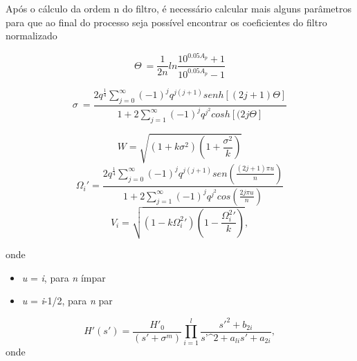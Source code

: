 \documentclass[a4paper,10pt]{article}
\begin{document}
	Após o cálculo da ordem n do filtro, é necessário calcular mais alguns parâmetros para que ao final do processo seja possível encontrar os coeficientes do filtro normalizado

	\begin{equation}
		\Theta\ = \frac{1}{2n}ln\frac{10^{0.05A_{p}} + 1}{10^{0.05A_{p}} - 1}
	\end{equation}
	
	\begin{equation}
		\sigma\ =  \frac{2q^{\frac{1}{4}}\sum_{j=0}^{\infty} (-1)^{j} q^{j(j+1)} senh[(2j+1)\Theta]}								{1+2\sum_{j=1}^{\infty}  (-1)^{j} q^{j^{2}} cosh[(2j\Theta]}
	\end{equation}
	
	\begin{equation}
		W = \sqrt{(1+k\sigma^{2})(1+\frac{\sigma^{2}}{k})}
	\end{equation}
	\begin{equation}
		\Omega_{i}' =	\frac{2q^{\frac{1}{4}}\sum_{j=0}^{\infty} (-1)^{j} q^{j(j+1)} sen(\frac{(2j+1)\pi 		u}		{n})}								{1+2\sum_{j=1}^{\infty}  (-1)^{j} q^{j^{2}} 					cos(\frac{2j\pi u}			{n})}
	\end{equation}
	\begin{equation}
		V_{i} = \sqrt{(1-k\Omega_{i}^{2}')(1-\frac{\Omega_{i}^{2}'}{k})} ,
	\end{equation}
	
	onde
	
	\begin{itemize}
		\item \textit{u} = \textit{i},  para \textit{n} ímpar
		\item \textit{u} = \textit{i}-1/2,  para \textit{n} par	
	\end{itemize}
	
	\begin{equation}
		H'(\textit{s}') = \frac{H'_{0}}{(\textit{s}'+\sigma^{m})} \prod_{i=1}^{l} \frac {\textit{s}'^{2} 																						+b_{2i}}														{\textit{s'^{2}}+\textit{a}_{li}\textit{s}'+\textit{a}_{2i}},
	\end{equation}
		onde 
		
\end{document}
